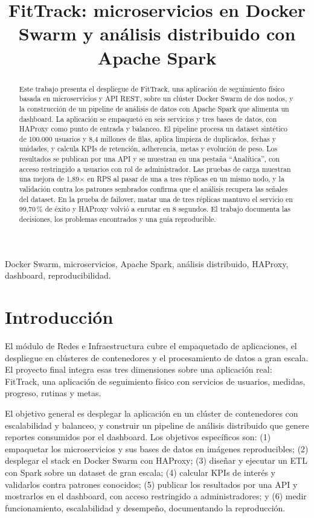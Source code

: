 \documentclass[conference]{IEEEtran}
\title{FitTrack: microservicios en Docker Swarm y análisis distribuido con Apache Spark}
\author{
\IEEEauthorblockN{Juan Camilo Serrano, Lucio Matías Melendez Rojas, Juan David Ocampo Gutierrez,\\
Nicolás Castro Pacheco, Diego Fernando Asprilla Palacios}
\IEEEauthorblockA{Curso de Redes e Infraestructura\\
Universidad Autónoma de Occidente\\
Cali, Colombia\\
Noviembre de 2026}
}
\begin{document}
\maketitle

\begin{abstract}
Este trabajo presenta el despliegue de FitTrack, una aplicación de seguimiento físico basada en
microservicios y API REST, sobre un clúster Docker Swarm de dos nodos, y la construcción de un
pipeline de análisis de datos con Apache Spark que alimenta un dashboard. La aplicación se empaquetó
en seis servicios y tres bases de datos, con HAProxy como punto de entrada y balanceo. El pipeline
procesa un dataset sintético de 100.000 usuarios y 8,4 millones de filas, aplica limpieza de
duplicados, fechas y unidades, y calcula KPIs de retención, adherencia, metas y evolución de peso.
Los resultados se publican por una API y se muestran en una pestaña ``Analítica'', con acceso restringido
a usuarios con rol de administrador. Las pruebas de carga muestran una mejora de 1,89$\times$ en RPS al
pasar de una a tres réplicas en un mismo nodo, y la validación
contra los patrones sembrados confirma que el análisis recupera las señales del dataset. En la prueba
de failover, matar una de tres réplicas mantuvo el servicio en 99,70\,\% de éxito y HAProxy volvió a
enrutar en 8 segundos. El trabajo documenta las decisiones, los problemas encontrados y una guía reproducible.
\end{abstract}

\begin{IEEEkeywords}
Docker Swarm, microservicios, Apache Spark, análisis distribuido, HAProxy, dashboard,
reproducibilidad.
\end{IEEEkeywords}

\section{Introducción}
El módulo de Redes e Infraestructura cubre el empaquetado de aplicaciones, el despliegue en clústeres
de contenedores y el procesamiento de datos a gran escala. El proyecto final integra esas tres
dimensiones sobre una aplicación real: FitTrack, una aplicación de seguimiento físico con servicios
de usuarios, medidas, progreso, rutinas y metas.

El objetivo general es desplegar la aplicación en un clúster de contenedores con escalabilidad y
balanceo, y construir un pipeline de análisis distribuido que genere reportes consumidos por el
dashboard. Los objetivos específicos son: (1) empaquetar los microservicios y sus bases de datos en
imágenes reproducibles; (2) desplegar el stack en Docker Swarm \cite{docker} con HAProxy; (3)
diseñar y ejecutar un ETL con Spark \cite{spark} sobre un dataset de gran escala; (4) calcular KPIs de
interés y validarlos contra patrones conocidos; (5) publicar los resultados por una API y mostrarlos
en el dashboard, con acceso restringido a administradores; y (6) medir funcionamiento, escalabilidad y
desempeño, documentando la reproducción.
\end{document}
